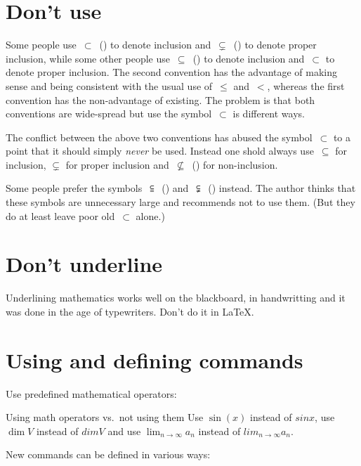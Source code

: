 \section{Don’t use \texorpdfstring{}{{\tbs}subseteq}}

Some people use~$\subset$~() to denote inclusion and~$\subsetneq$~() to denote proper inclusion, while some other people use~$\subseteq$~() to denote inclusion and~$\subset$ to denote proper inclusion.
The second convention has the advantage of making sense and being consistent with the usual use of~$\leq$ and~$<$, whereas the first convention has the non-advantage of existing.
The problem is that both conventions are wide-spread but use the symbol~$\subset$ is different ways.

The conflict between the above two conventions has abused the symbol~$\subset$ to a point that it should simply \emph{never} be used.
Instead one shold always use~$\subseteq$ for inclusion, $\subsetneq$ for proper inclusion and~$\nsubseteq$~() for non-inclusion.

Some people prefer the symbols~$\subseteqq$~() and~$\subsetneqq$~() instead.
The author thinks that these symbols are unnecessary large and recommends not to use them.
(But they do at least leave poor old~$\subset$ alone.)





\section{Don’t underline}

Underlining mathematics works well on the blackboard, in handwritting and it was done in the age of typewriters.
Don’t do it in {\LaTeX}.





\section{Using and defining commands}

Use predefined mathematical operators:
\begin{showlatex}{Using math operators vs.\ not using them}
Use $\sin(x)$ instead of $sin x$, use $\dim V$ instead of $dim V$ and use $\lim_{n \to \infty} a_n$ instead of $lim_{n \to \infty} a_n$.
\end{showlatex}
New commands can be defined in various ways:



